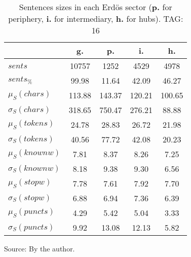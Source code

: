 \begin{table}[h!]
\begin{center}
	\caption{Sentences sizes in each Erd\"os sector ({{\bf p.}} for periphery, {{\bf i.}} for intermediary, {{\bf h.}} for hubs). TAG: 16}\label{tab:sizesSents}
\begin{tabular}{| l || c | c | c | c |}\hline
 & {\bf g.} & {\bf p.} & {\bf i.} & {\bf h.} \\\hline\hline
$sents$ & 10757  & 1252  & 4529  & 4978 \\
$sents_{\%}$ & 99.98  & 11.64  & 42.09  & 46.27 \\\hline
$\mu_S(chars)$ & 113.88  & 143.37  & 120.21  & 100.65 \\
$\sigma_S(chars)$ & 318.65  & 750.47  & 276.21  & 88.88 \\\hline
$\mu_S(tokens)$ & 24.78  & 28.83  & 26.72  & 21.98 \\
$\sigma_S(tokens)$ & 40.56  & 77.72  & 42.08  & 20.23 \\\hline
$\mu_S(knownw)$ & 7.81  & 8.37  & 8.26  & 7.25 \\
$\sigma_S(knownw)$ & 8.18  & 9.38  & 9.30  & 6.56 \\\hline
$\mu_S(stopw)$ & 7.78  & 7.61  & 7.92  & 7.70 \\
$\sigma_S(stopw)$ & 6.88  & 6.94  & 7.36  & 6.39 \\\hline
$\mu_S(puncts)$ & 4.29  & 5.42  & 5.04  & 3.33 \\
$\sigma_S(puncts)$ & 9.92  & 13.08  & 12.13  & 5.82 \\\hline
\end{tabular}
\begin{flushleft}\footnotesize
		Source: By the author.\
\end{flushleft}
\end{center}
\end{table}
